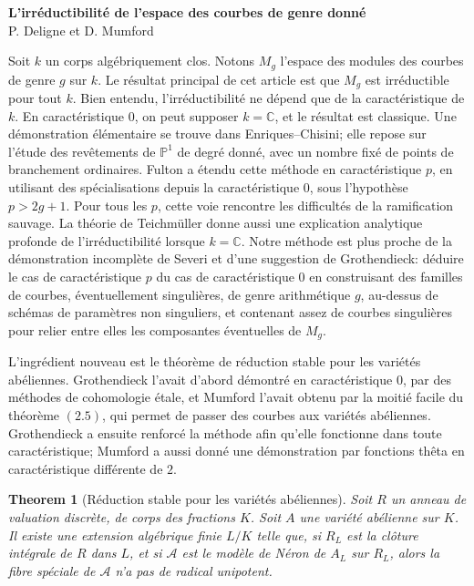 \documentclass[11pt]{article}
\theoremstyle{plain}
\newtheorem*{theorem*}{Theorem}
\theoremstyle{definition}
\theoremstyle{remark}
\begin{document}
\begin{center}
{\Large\bfseries L'irréductibilité de l'espace des courbes de genre donné}\\[0.6em]
{\large P. Deligne et D. Mumford}
\end{center}
\vspace{0.7em}


Soit \(k\) un corps algébriquement clos. Notons \(M_g\) l'espace des modules des courbes de genre \(g\) sur \(k\). Le résultat principal de cet article est que \(M_g\) est irréductible pour tout \(k\). Bien entendu, l'irréductibilité ne dépend que de la caractéristique de \(k\). En caractéristique \(0\), on peut supposer \(k=\mathbb C\), et le résultat est classique. Une démonstration élémentaire se trouve dans Enriques--Chisini; elle repose sur l'étude des revêtements de \(\mathbb P^1\) de degré donné, avec un nombre fixé de points de branchement ordinaires. Fulton a étendu cette méthode en caractéristique \(p\), en utilisant des spécialisations depuis la caractéristique \(0\), sous l'hypothèse \(p>2g+1\). Pour tous les \(p\), cette voie rencontre les difficultés de la ramification sauvage. La théorie de Teichmüller donne aussi une explication analytique profonde de l'irréductibilité lorsque \(k=\mathbb C\). Notre méthode est plus proche de la démonstration incomplète de Severi et d'une suggestion de Grothendieck: déduire le cas de caractéristique \(p\) du cas de caractéristique \(0\) en construisant des familles de courbes, éventuellement singulières, de genre arithmétique \(g\), au-dessus de schémas de paramètres non singuliers, et contenant assez de courbes singulières pour relier entre elles les composantes éventuelles de \(M_g\).

L'ingrédient nouveau est le théorème de réduction stable pour les variétés abéliennes. Grothendieck l'avait d'abord démontré en caractéristique \(0\), par des méthodes de cohomologie étale, et Mumford l'avait obtenu par la moitié facile du théorème \((2.5)\), qui permet de passer des courbes aux variétés abéliennes. Grothendieck a ensuite renforcé la méthode afin qu'elle fonctionne dans toute caractéristique; Mumford a aussi donné une démonstration par fonctions thêta en caractéristique différente de \(2\).

\begin{theorem*}[Réduction stable pour les variétés abéliennes]
Soit \(R\) un anneau de valuation discrète, de corps des fractions \(K\). Soit \(A\) une variété abélienne sur \(K\). Il existe une extension algébrique finie \(L/K\) telle que, si \(R_L\) est la clôture intégrale de \(R\) dans \(L\), et si \(\mathcal A\) est le modèle de Néron de \(A_L\) sur \(R_L\), alors la fibre spéciale de \(\mathcal A\) n'a pas de radical unipotent.
\end{theorem*}
\end{document}

